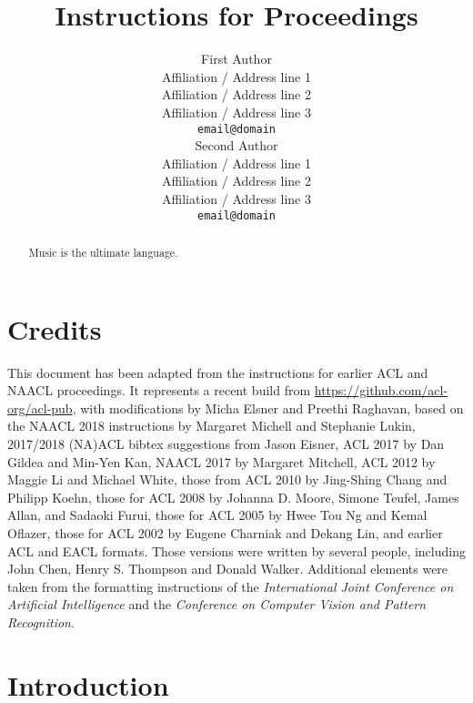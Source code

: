 \documentclass[11pt,a4paper]{article}
\title{Instructions for \confname{} Proceedings}
\author{First Author \\
  Affiliation / Address line 1 \\
  Affiliation / Address line 2 \\
  Affiliation / Address line 3 \\
  {\tt email@domain} \\\And
  Second Author \\
  Affiliation / Address line 1 \\
  Affiliation / Address line 2 \\
  Affiliation / Address line 3 \\
  {\tt email@domain} \\}
\date{}
\begin{document}
\maketitle
\begin{abstract}
Music is the ultimate language.
\end{abstract}

\section{Credits}

This document has been adapted from the instructions for earlier ACL
and NAACL proceedings. It represents a recent build from
\url{https://github.com/acl-org/acl-pub}, with modifications by Micha
Elsner and Preethi Raghavan, based on the NAACL 2018 instructions by
Margaret Michell and Stephanie Lukin, 2017/2018 (NA)ACL bibtex
suggestions from Jason Eisner, ACL 2017 by Dan Gildea and Min-Yen Kan,
NAACL 2017 by Margaret Mitchell, ACL 2012 by Maggie Li and Michael
White, those from ACL 2010 by Jing-Shing Chang and Philipp Koehn,
those for ACL 2008 by Johanna D. Moore, Simone Teufel, James Allan,
and Sadaoki Furui, those for ACL 2005 by Hwee Tou Ng and Kemal
Oflazer, those for ACL 2002 by Eugene Charniak and Dekang Lin, and
earlier ACL and EACL formats.  Those versions were written by several
people, including John Chen, Henry S. Thompson and Donald
Walker. Additional elements were taken from the formatting
instructions of the {\em International Joint Conference on Artificial
  Intelligence} and the \emph{Conference on Computer Vision and
  Pattern Recognition}.

\section{Introduction}
\end{document}
